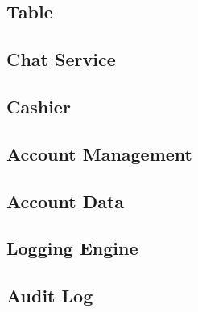 \documentclass[a4paper,11pt]{report}
\begin{document}
\subsection{Table}
\subsection{Chat Service}
\subsection{Cashier}
\subsection{Account Management}
\subsection{Account Data}
\subsection{Logging Engine}
\subsection{Audit Log}
\end{document}
